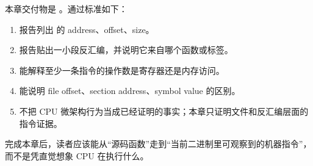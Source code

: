 
本章交付物是 。通过标准如下：

\begin{enumerate}
  \item 报告列出  的 address、offset、size。
  \item 报告贴出一小段反汇编，并说明它来自哪个函数或标签。
  \item 能解释至少一条指令的操作数是寄存器还是内存访问。
  \item 能说明 file offset、section address、symbol value 的区别。
  \item 不把 CPU 微架构行为当成已经证明的事实；本章只证明文件和反汇编层面的指令证据。
\end{enumerate}

完成本章后，读者应该能从“源码函数”走到“当前二进制里可观察到的机器指令”，而不是凭直觉想象 CPU 在执行什么。
